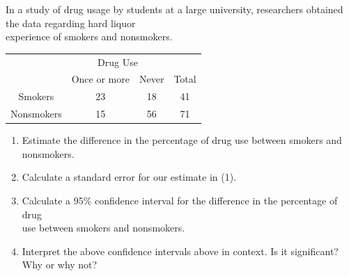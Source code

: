 \documentclass[11pt, chapterprefix=true]{scrbook}\usepackage[]{graphicx}\usepackage[]{color}
\begin{document}
\begin{exercises}
\begin{exercise}  %

In a study of drug usage by students at a large university, researchers obtained the data regarding hard liquor \\ experience of smokers and nonsmokers.

\begin{table}[ht]
\centering
{\small{
\begin{tabular}{@{} cccc @{}} \hline
 & \multicolumn{2}{c}{Drug Use} \\
 & Once or more & Never & Total \\ \hline
Smokers & 23 & 18 & 41 \\
Nonsmokers & 15 & 56 & 71 \\ \hline
\end{tabular}
}}
\end{table}

\begin{enumerate}
\item Estimate the difference in the percentage of drug use between smokers and nonsmokers.
\item Calculate a standard error for our estimate in (1).
\item Calculate a 95\% confidence interval for the difference in the percentage of drug \\ use between smokers and nonsmokers.
\item Interpret the above confidence intervals above in context.
Is it significant? Why or why not?
\end{enumerate}


\end{exercise}
\end{exercises}
\end{document}
